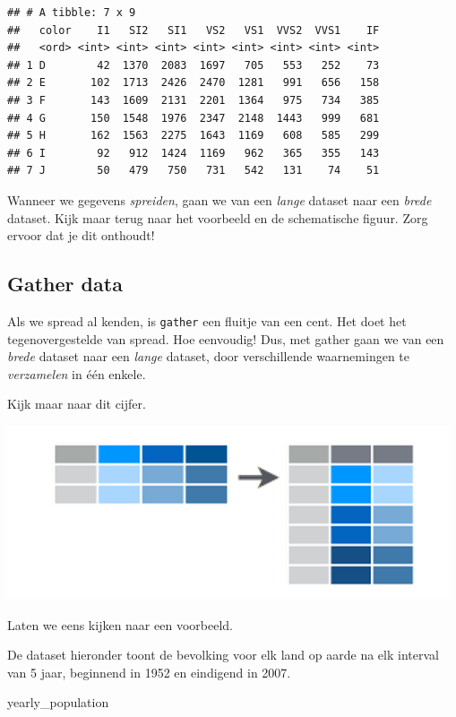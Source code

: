 \documentclass[]{tufte-book}
\newenvironment{Shaded}{}{}
\newcommand{\NormalTok}[1]{#1}
\begin{document}
\begin{verbatim}
## # A tibble: 7 x 9
##   color    I1   SI2   SI1   VS2   VS1  VVS2  VVS1    IF
##   <ord> <int> <int> <int> <int> <int> <int> <int> <int>
## 1 D        42  1370  2083  1697   705   553   252    73
## 2 E       102  1713  2426  2470  1281   991   656   158
## 3 F       143  1609  2131  2201  1364   975   734   385
## 4 G       150  1548  1976  2347  2148  1443   999   681
## 5 H       162  1563  2275  1643  1169   608   585   299
## 6 I        92   912  1424  1169   962   365   355   143
## 7 J        50   479   750   731   542   131    74    51
\end{verbatim}

Wanneer we gegevens \emph{spreiden}, gaan we van een \emph{lange} dataset naar een \emph{brede} dataset. Kijk maar terug naar het voorbeeld en de schematische figuur. Zorg ervoor dat je dit onthoudt!

\hypertarget{gather-data}{%
\subsection{Gather data}\label{gather-data}}

Als we spread al kenden, is \texttt{gather} een fluitje van een cent. Het doet het tegenovergestelde van spread. Hoe eenvoudig! Dus, met gather gaan we van een \emph{brede} dataset naar een \emph{lange} dataset, door verschillende waarnemingen te \emph{verzamelen} in één enkele.

Kijk maar naar dit cijfer.

\includegraphics[width=1\linewidth]{images/gather}

Laten we eens kijken naar een voorbeeld.

De dataset hieronder toont de bevolking voor elk land op aarde na elk interval van 5 jaar, beginnend in 1952 en eindigend in 2007.

\begin{Shaded}
\begin{Highlighting}[]
\NormalTok{yearly\_population}
\end{Highlighting}
\end{Shaded}
\end{document}
